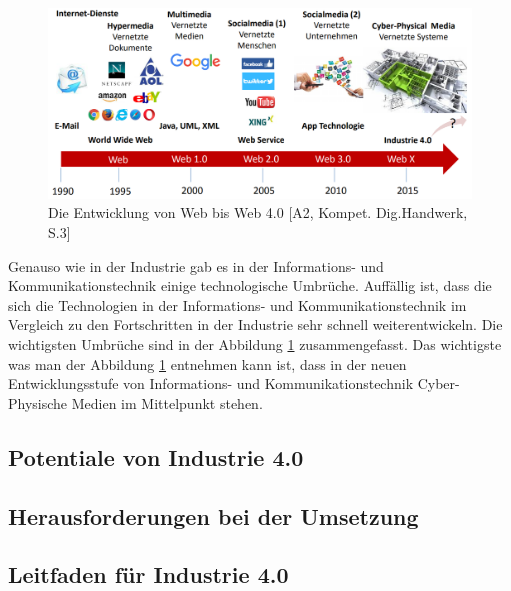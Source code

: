 \begin{figure}[h]
	\centering
	\includegraphics[width=1\linewidth]{Bilder/A2_EntwicklungWeb0-4}
	\caption{Die Entwicklung von Web bis Web 4.0 [A2, Kompet. Dig.Handwerk, S.3]}
	\label{fig:WebRevolutionBild}
\end{figure}

Genauso wie in der Industrie gab es in der Informations- und Kommunikationstechnik einige technologische Umbrüche. Auffällig ist, dass die sich die Technologien in der Informations- und Kommunikationstechnik im Vergleich zu den Fortschritten in der Industrie sehr schnell weiterentwickeln. Die wichtigsten Umbrüche sind in der Abbildung \ref{fig:WebRevolutionBild} zusammengefasst.
\newline\newline
Das wichtigste was man der Abbildung \ref{fig:WebRevolutionBild} entnehmen kann ist, dass in der neuen Entwicklungsstufe von Informations- und Kommunikationstechnik Cyber-Physische Medien im Mittelpunkt stehen.


\subsection{Potentiale von Industrie 4.0}\label{sec:PotentialeIndustrie4.0}

\lipsum[2]

\subsection{Herausforderungen bei der Umsetzung}\label{sec:HerausforderungenUmsetzung}

\lipsum[2]

\subsection{Leitfaden für Industrie 4.0}\label{sec:LeitfadenUmsetung}

